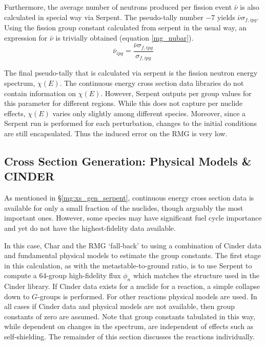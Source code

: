 Furthermore, the average number of neutrons produced per fission event $\bar{\nu}$ is also 
calculated in special way via Serpent.  The pseudo-tally number $-7$ yields $\bar{\nu}\sigma_{f,ipg}$.
Using the fission group constant calculated from serpent in the usual way, an expression for $\bar{\nu}$
is trivially obtained (equation \ref{mg_nubar}).
\begin{equation}
\label{mg_nubar}
\bar{\nu}_{ipg} = \frac{\bar{\nu}\sigma_{f,ipg}}{\sigma_{f,ipg}}
\end{equation}

The final pseudo-tally that is calculated via serpent is the fission neutron energy spectrum, $\chi(E)$.
The continuous energy cross section data libraries do not contain information on $\chi(E)$.  However, 
Serpent outputs per group values for this parameter for different regions.  While this does not 
capture per nuclide effects, $\chi(E)$ varies only slightly among different species.  
Moreover, since a Serpent run is performed for each perturbation, changes to 
the initial conditions are still encapsulated.  Thus the induced error on the RMG is very low.


\subsection{Cross Section Generation: Physical Models \& CINDER}
\label{mg:xs_gen_physics}
As mentioned in \S \ref{mg:xs_gen_serpent}, continuous energy cross section data is available for only 
a small fraction of the nuclides, though arguably the most important ones.  However, some species 
may have significant fuel cycle importance and yet do not have the highest-fidelity data available.

In this case, Char and the RMG `fall-back' to using a combination of Cinder data and fundamental 
physical models to estimate the group constants. The first stage in this calculation, as with the 
metastable-to-ground ratio, is to use Serpent to compute a 64-group high-fidelity flux $\phi_n$
which matches the structure used in the Cinder library.  If Cinder data exists for a nuclide for 
a reaction, a simple collapse down to $G$-groups is performed.  For other reactions physical
models are used.  In all cases if Cinder data and physical models are not available, then group
constants of zero are assumed.  Note that group constants tabulated in this way, while dependent 
on changes in the spectrum, are independent of effects such as self-shielding.
The remainder of this section discusses the reactions individually.

